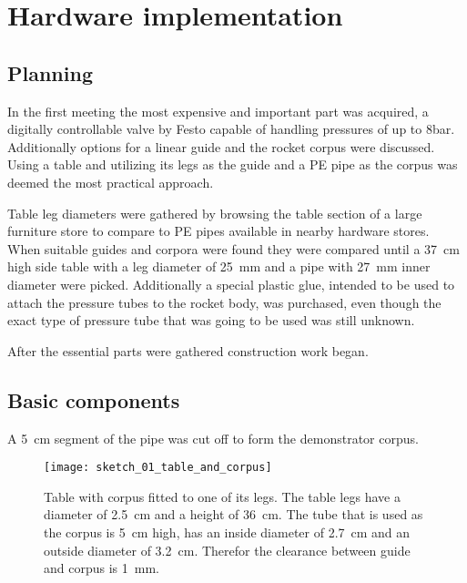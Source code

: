 \section{Hardware implementation}
\subsection{Planning}
In the first meeting the most expensive and important part was acquired, a digitally controllable valve by Festo \cite{festo-valve} capable of handling pressures of up to 8bar. Additionally options for a linear guide and the rocket corpus were discussed. Using a table and utilizing its legs as the guide and a PE pipe as the corpus was deemed the most practical approach. 

Table leg diameters were gathered by browsing the table section of a large furniture store to compare to PE pipes available in nearby hardware stores. When suitable guides and corpora were found they were compared until a \SI{37}{\centi\meter} high side table \cite{table} with a leg diameter of \SI{25}{\milli\meter} and a pipe with \SI{27}{\milli\meter} inner diameter were picked. Additionally a special plastic glue, intended to be used to attach the pressure tubes to the rocket body, was purchased, even though the exact type of pressure tube that was going to be used was still unknown.

After the essential parts were gathered construction work began. 

\subsection{Basic components}
A \SI{5}{\centi\meter} segment of the pipe was cut off to form the demonstrator corpus.

\begin{figure}[h]
\centering

\texttt{[image: sketch\_01\_table\_and\_corpus]}

\caption{Table with corpus fitted to one of its legs. The table legs have a diameter of \SI{2,5}{\centi\meter} and a height of \SI{36}{\centi\meter}. The tube that is used as the corpus is \SI{5}{\centi\meter} high, has an inside diameter of \SI{2,7}{\centi\meter} and an outside diameter of \SI{3,2}{\centi\meter}. Therefor the clearance between guide and corpus is \SI{1}{\milli\meter}.}
\end{figure}


